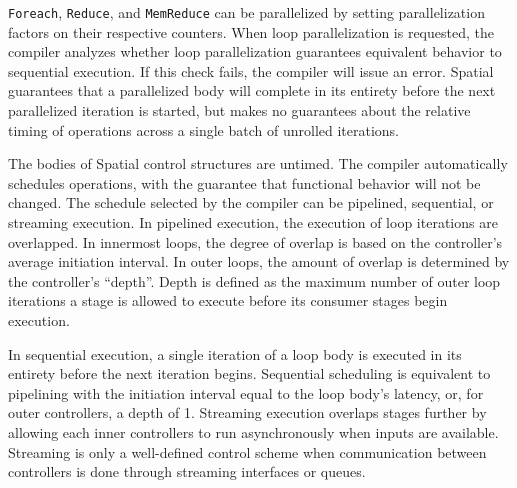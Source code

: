 \texttt{\small{Foreach}}, \texttt{\small{Reduce}}, and \texttt{\small{MemReduce}} can be parallelized by setting parallelization factors on their respective counters. 
When loop parallelization is requested, the compiler analyzes whether 
loop parallelization guarantees equivalent behavior to sequential execution. 
If this check fails, the compiler will issue an error.
Spatial guarantees that a parallelized body will complete in its entirety before the next parallelized iteration is started, but makes no guarantees about the relative timing of operations across a single batch of unrolled iterations.

The bodies of Spatial control structures are untimed. The compiler automatically schedules operations, with the guarantee that functional behavior will not be changed.
The schedule selected by the compiler can be pipelined, sequential, or streaming execution. In pipelined execution, the execution of loop iterations are overlapped. 
In innermost loops, the degree of overlap is based on the controller's average initiation interval.
In outer loops, the amount of overlap is determined by the controller's ``depth''. Depth is defined as the maximum number of outer loop iterations a stage is allowed to execute before its consumer stages begin execution. 

In sequential execution, a single iteration of a loop body is executed in its entirety before the next iteration begins.
Sequential scheduling is equivalent to pipelining with the initiation interval equal to the loop body's latency, or, for outer controllers, a depth of 1. Streaming execution overlaps stages further by allowing each inner controllers to run asynchronously when inputs are available. 
Streaming is only a well-defined control scheme when communication between controllers is done through streaming interfaces or queues.


